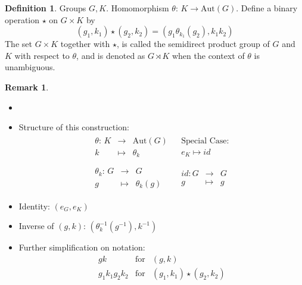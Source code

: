 \documentclass{book}
\newcommand{\Aut}[1]{\textrm{Aut}( #1 )}
\theoremstyle{definition}
\newtheorem{definition}[lemma]{Definition}
\theoremstyle{remarkstyle}
\newtheorem*{remark}{Remark}%
\begin{document}
\begin{definition}
    Groups $G,K$. Homomorphism $\theta: \, K \rightarrow \Aut{G} $. Define a binary operation $\star$ on $G\times K$ by $$
    (g_{1}, k_{1}) \star (g_{2}, k_{2}) = (g_{1}\theta_{k_1}(g_{2}), k_{1}k_{2})
    $$
    The set $G\times K$ together with $\star$, is called the semidirect product group of $G$ and $K$ with respect to $\theta$, and is denoted as $G\rtimes K$ when the context of $\theta$ is unambiguous. 
\end{definition}
\begin{remark}
    \begin{itemize}
        \item[]
        \item Structure of this construction: $$
        \begin{array}{cc}
            \begin{array}{rcl}
                \theta: \, K  & \rightarrow & \Aut{G} \\
                k & \mapsto & \theta_{k}
            \end{array} & \begin{array}{c}
                \textrm{Special Case:} \\
                 e_{K} \mapsto id
            \end{array}  \\
            & \\
             \begin{array}{rcl}
                \theta_{k} : \, G &\rightarrow & G \\
                g &\mapsto & \theta_{k}(g)
            \end{array} & \begin{array}{rcl}
                id: G &\rightarrow & G \\
                g &\mapsto & g
            \end{array}
        \end{array}
        $$
        \item Identity: $(e_{G}, e_{K}) $
        \item Inverse of $(g,k)$: $(\theta^{-1}_{k}(g^{-1}), k^{-1}) $
        \item Further simplification on notation: $$
        \begin{array}{rcl}
            gk & \textrm{for} & (g, k) \\
            g_{1}k_{1}g_{2}k_{2} & \textrm{for} & (g_{1},k_{1})\star(g_{2},k_{2}) \\

\end{array}$$
\end{itemize}
\end{remark}
\end{document}
